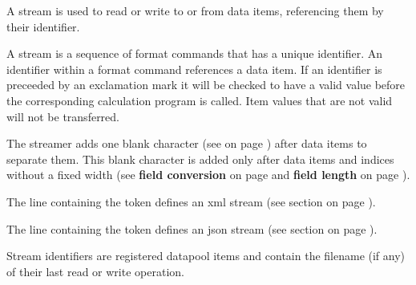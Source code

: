 
A stream is used to read or write to or from data items, referencing them by their identifier. \\
\vspace{1cm}

A stream is a sequence of format commands that has a unique identifier.
An identifier within a format command references a data item.
If an identifier is preceeded by an exclamation mark it will be checked
to have a valid value before the corresponding calculation program
is called. Item values that are not valid will not be transferred.

The streamer adds one blank character (see \DELIMITER{} on page \pageref{dia:stoptionlist}) after data items to separate them.
This blank character is added only after data items and indices without
a fixed width
 (see {\bfseries field conversion} on page \pageref{par:fieldconversion}
  and {\bfseries field length} on page \pageref{par:stfieldlength}).

The line containing the \XML{} token defines an xml stream
(see section  on page \pageref{sec:stxmlcommand}).

The line containing the \JSON{} token defines an json stream
(see section  on page \pageref{sec:stjsoncommand}).

Stream identifiers are registered datapool items and contain the filename
(if any) of their last read or write operation.



